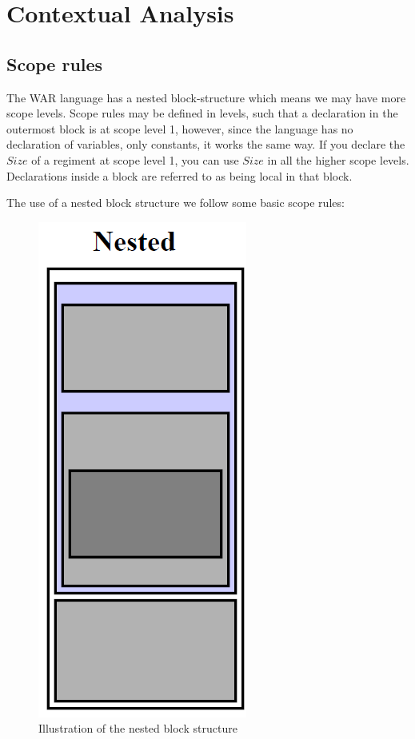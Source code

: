 \section{Contextual Analysis}

	\subsection{Scope rules}
	The WAR language has a nested block-structure which means we may have more scope levels. Scope rules may be defined in levels, such that a declaration in the outermost block is at scope level 1, however, since the language has no declaration of variables, only constants, it works the same way. If you declare the $Size$ of a regiment at scope level 1, you can use $Size$ in all the higher scope levels. Declarations inside a block are referred to as being local in that block.

	The use of a nested block structure we follow some basic scope rules:
	\begin{figure}
		\begin{center}
			\includegraphics[scale=0.5]{rapport/5/figures/nested_block_structure}
		\end{center}	
		\caption{Illustration of the nested block structure}
		\label{nested_block_structure}
	\end{figure}


